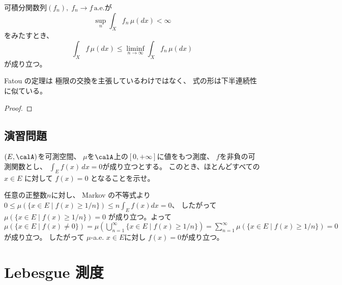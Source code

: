 \documentclass[report]{jlreq}
\begin{document}
\begin{theorem}
    可積分関数列$(f_n), \; f_n \to f \, \text{a.e.}$が
    \begin{equation}
        \sup_n \int_X f_n \, \mu(dx) < \infty
    \end{equation}
    をみたすとき、
    \begin{equation}
        \int_X f \, \mu(dx)
            \le
                \liminf_{n \to \infty} \int_X f_n \, \mu(dx)
    \end{equation}
    が成り立つ。
\end{theorem}

Fatou の定理は
極限の交換を主張しているわけではなく、
式の形は下半連続性に似ている。

\begin{proof}
    \TODO{}
\end{proof}

%
\newpage
\section{演習問題}

\begin{problem}[ChatGPT]
    $(E, \calA)$を可測空間、
    $\mu$を$\calA$上の$[0, +\infty]$に値をもつ測度、
    $f$を非負の可測関数とし、
    $\int_E f(x) \, dx = 0$が成り立つとする。
    このとき、ほとんどすべての $x \in E$ に対して
    $f(x) = 0$ となることを示せ。
\end{problem}

\begin{answer}
    任意の正整数$n$に対し、
    Markov の不等式より
    $0 \le \mu(\{ x \in E \mid f(x) \ge 1/n \}) \le n \int_E f(x) dx = 0$、
    したがって
    $\mu(\{ x \in E \mid f(x) \ge 1/n \}) = 0$
    が成り立つ。よって
    $\mu(\{ x \in E \mid f(x) \neq 0 \})
        = \mu(\bigcup_{n = 1}^\infty \{ x \in E \mid f(x) \ge 1/n \})
        = \sum_{n = 1}^\infty \mu(\{ x \in E \mid f(x) \ge 1/n \})
        = 0$
    が成り立つ。
    したがって
    $\mu$-a.e. $x \in E$に対し
    $f(x) = 0$が成り立つ。
\end{answer}




%
\chapter{Lebesgue 測度}
\end{document}
